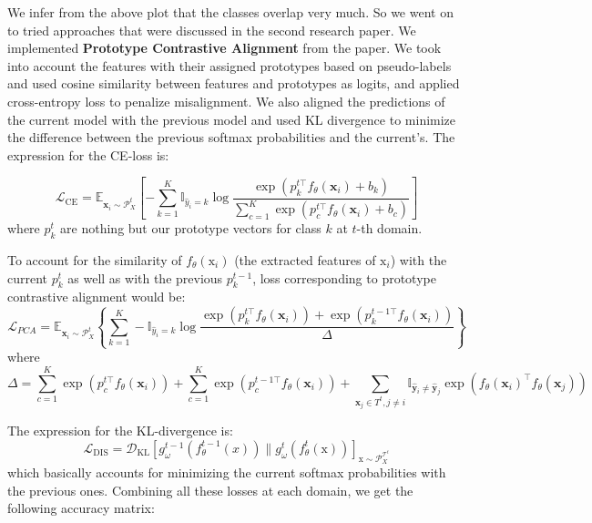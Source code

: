 \documentclass{article} %
\begin{document}
We infer from the above plot that the classes overlap very much. So we went on to tried approaches that were discussed in the second research paper. We implemented \textbf{Prototype Contrastive Alignment} from the paper. We took into account the features with their assigned prototypes based on pseudo-labels and used cosine similarity between features and prototypes as logits, and applied cross-entropy loss to penalize misalignment. We also aligned the predictions of the current model with the previous model and used KL divergence to minimize the difference between the previous softmax probabilities and the current's. The expression for the CE-loss is: 

$$\mathcal{L}_{\text{CE}} = \mathbb{E}_{\textbf{x}_i \sim \mathcal{P}_X^t} \left[ - \sum_{k=1}^K \mathbb{I}_{\hat{y}_i = k} \log \frac{\exp \left( p_k^{t \top} f_\theta(\textbf{x}_i) + b_k \right)}{\sum_{c=1}^K \exp \left( p_c^{t \top} f_\theta(\textbf{x}_i) + b_c \right)} \right]$$
where $p_k^t$ are nothing but our prototype vectors for class $k$ at $t$-th domain. 

To account for the similarity of $f_\theta(\text{x}_i)$ (the extracted features of $\text{x}_i$) with the current $p_k^t$ as well as with the previous $p_k^{t - 1}$, loss corresponding to prototype contrastive alignment would be: 
\[\mathcal{L}_{PCA} = \mathbb{E}_{\textbf{x}_i \sim \mathcal{P}_X^t} \left\{\sum_{k=1}^K -\mathbb{I}_{\hat{y}_i = k} \log \frac{\exp \left( p_k^{t \top} f_\theta(\textbf{x}_i) \right) + \exp \left( p_k^{t-1 \top} f_\theta(\textbf{x}_i) \right)}{\Delta}\right \}
\]
where 
$$ \Delta = \sum_{c=1}^K \exp \left( p_c^{t \top} f_\theta(\textbf{x}_i) \right) + \sum_{c=1}^K \exp \left( p_c^{t-1 \top} f_\theta(\textbf{x}_i) \right) +\sum_{\textbf{x}_j \in T^t, j \neq i} \mathbb{I}_{\hat{\textbf{y}}_i \neq \hat{\textbf{y}}_j} \exp \left( f_\theta(\textbf{x}_i)^{\top} f_\theta(\textbf{x}_j) \right) $$

The expression for the KL-divergence is: 
$$\mathcal{L}_{\text{DIS}} = \mathcal{D}_{\text{KL}} [g_\omega^{t-1} (f_\theta^{t-1} (x)) \| g_\omega^t (f_\theta^t(\text{x}))]_{\text{x} \sim \mathcal{P}_X^{\mathcal{T}^t}}$$
which basically accounts for minimizing the current softmax probabilities with the previous ones. Combining all these losses at each domain, we get the following accuracy matrix: 
\end{document}
